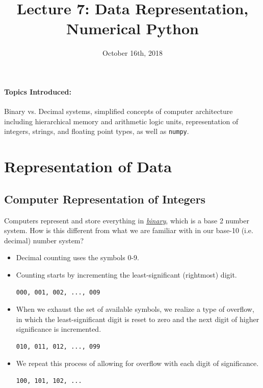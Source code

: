 \documentclass[12pt,letterpaper,twoside]{article}
\begin{document}
\title{Lecture 7: Data Representation, Numerical Python\vspace{-5ex}}
\date{October 16th, 2018}
\maketitle

{\footnotesize
\paragraph{Topics Introduced:} Binary vs. Decimal systems, simplified
concepts of computer architecture including hierarchical memory and
arithmetic logic units, representation of integers, strings, and
floating point types, as well as \texttt{numpy}.
}
\vspace{-3ex}
\section{Representation of Data}

\subsection{Computer Representation of Integers}
Computers represent and store everything in
\href{https://en.wikipedia.org/wiki/Binary_number#Binary_counting}{\emph{binary}},
which is a base 2 number system. How is this different from what we
are familiar with in our base-10 (i.e. decimal) number system?

\begin{itemize}
\item Decimal counting uses the symbols 0-9.
\item Counting starts by incrementing the least-significant
  (rightmost) digit.

\begin{verbatim}
000, 001, 002, ..., 009
\end{verbatim}
\item When we exhaust the set of available symbols, we realize a type
  of overflow, in which the least-significant digit is reset to zero
  and the next digit of higher significance is incremented.

\begin{verbatim}
010, 011, 012, ..., 099
\end{verbatim}

\item We repeat this process of allowing for overflow with each digit
  of significance.

\begin{verbatim}
100, 101, 102, ...  
\end{verbatim}
\end{itemize}
\end{document}
